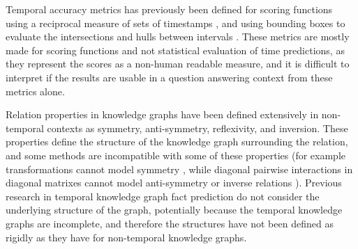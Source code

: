 Temporal accuracy metrics has previously been defined for scoring functions using a reciprocal measure of sets of timestamps \cite{surdeanu2013overviewtac}, and using bounding boxes to evaluate the intersections and hulls between intervals \cite{jain2020timeplex}. These metrics are mostly made for scoring functions and not statistical evaluation of time predictions, as they represent the scores as a non-human readable measure, and it is difficult to interpret if the results are usable in a question answering context from these metrics alone.

Relation properties in knowledge graphs have been defined extensively in non-temporal contexts as symmetry, anti-symmetry, reflexivity, and inversion. These properties define the structure of the knowledge graph surrounding the relation, and some methods are incompatible with some of these properties (for example transformations cannot model symmetry \cite{chami2020atth}, while diagonal pairwise interactions in diagonal matrixes cannot model anti-symmetry or inverse relations \cite{gregucci23sepa}). Previous research in temporal knowledge graph fact prediction do not consider the underlying structure of the graph, potentially because the temporal knowledge graphs are incomplete, and therefore the structures have not been defined as rigidly as they have for non-temporal knowledge graphs.


